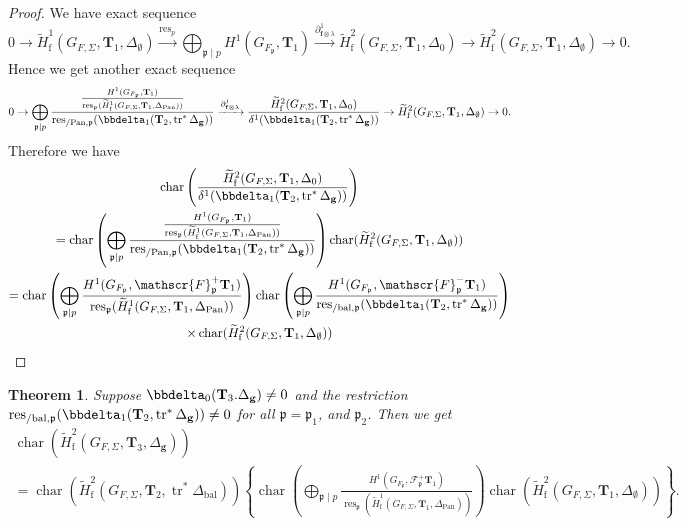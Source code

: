 \documentclass[10pt]{amsart}
\numberwithin{equation}{section}
\newtheorem{thm}{Theorem}[section]
\theoremstyle{definition}
\theoremstyle{remark} %
\DeclareMathOperator{\Char}{char}
\newcommand{\pan}{\mathrm{Pan}}
\DeclareMathOperator{\res}{res}
\DeclareMathOperator{\tr}{{tr}^*}
\renewcommand{\b}{\mathrm{bal}}
\newcommand{\f}{\mathbf{f}}
\newcommand{\scrF}{\mathscr{F}}
\newcommand{\g}{\mathbf{g}}
\newcommand{\p}{\mathfrak{p}}
\newcommand{\T}{\mathbf{T}}
\begin{document}
		\begin{proof}
			We have exact sequence
			\begin{equation}
				0 \rightarrow \widetilde{H}^1_{\mathrm{f}}(G_{F,\Sigma}, \T_1, \Delta_{\emptyset}) \xrightarrow{\res_p} \bigoplus_{\p \mid p} H^1(G_{F_\p},\T_{1}) \xrightarrow{\partial_{\f \otimes \lambda}^1} \widetilde{H}^2_{\mathrm{f}}(G_{F,\Sigma}, \T_1, \Delta_{0}) \rightarrow \widetilde{H}^2_{\mathrm{f}}(G_{F,\Sigma}, \T_1, \Delta_{\emptyset}) \rightarrow 0.
			\end{equation}
			Hence we get another exact sequence
			\begin{equation}
				0 \rightarrow \bigoplus_{\p \mid p} \dfrac{\frac{H^1(G_{F_\p},\T_{1})}{\res_{\p}(\widetilde{H}^1_{\mathrm{f}}(G_{F,\Sigma},\T_{1}, \Delta_{\pan})) }}{\res_{/\pan, \p}(\bbdelta_1(\T_2, \operatorname{tr}^*\Delta_{\g}))} \xrightarrow{\partial_{\f \otimes \lambda}^1} \dfrac{\widetilde{H}^2_{\mathrm{f}}(G_{F,\Sigma}, \T_1, \Delta_{0})}{\delta^1(\bbdelta_1(\T_{2}, \tr\Delta_{\g}))}\rightarrow \widetilde{H}^2_{\mathrm{f}}(G_{F,\Sigma}, \T_1, \Delta_{\emptyset}) \rightarrow 0.
			\end{equation}
			Therefore we have 
			\begin{multline}
				\Char\left( \dfrac{\widetilde{H}^2_{\mathrm{f}}(G_{F,\Sigma}, \T_1, \Delta_{0})}{\delta^1(\bbdelta_1(\T_{2}, \tr\Delta_{\g}))} \right) \\
				= \Char \left( \bigoplus_{\p \mid p} \dfrac{\frac{H^1(G_{F_\p},\T_{1})}{\res_{\p}(\widetilde{H}^1_{\mathrm{f}}(G_{F,\Sigma},\T_{1}, \Delta_{\pan})) }}{\res_{/\pan, \p}(\bbdelta_1(\T_2, \operatorname{tr}^*\Delta_{\g}))} \right) \Char(\widetilde{H}^2_{\mathrm{f}}(G_{F,\Sigma}, \T_1, \Delta_{\emptyset})) \\
				= \Char\left( \bigoplus_{\p \mid p}\frac{H^1(G_{F_\p},\scrF^+_\p \T_{1})}{\res_{\p}(\widetilde{H}^1_{\mathrm{f}}(G_{F,\Sigma},\T_{1}, \Delta_{\pan})) }\right) \Char\left( \bigoplus_{\p \mid p} \frac{H^1(G_{F_\p},\scrF^-_\p \T_{1})}{ \res_{/\b, \p}(\bbdelta_1(\T_2, \operatorname{tr}^*\Delta_{\g}))} \right) \\
				\times \Char(\widetilde{H}^2_{\mathrm{f}}(G_{F,\Sigma}, \T_1, \Delta_{\emptyset}))
			\end{multline}	
		\end{proof}

		\begin{thm}
			\label{main_theorem_2}
			Suppose $  \bbdelta_0(\T_{3}.\Delta_\g) \ne 0 $ and the restriction $ \res_{/\b, \p}(\bbdelta_1(\T_2, \operatorname{tr}^*\Delta_{\g})) \ne 0 $ for all $ \p = \p_1 $, and $ \p_2 $. Then we get
			\begin{multline*}
				\Char \left( \widetilde{H}^2_{\mathrm{f}}(G_{F,\Sigma}, \T_3, \Delta_{\g})  \right) \\
				= \Char(\widetilde{H}^2_{\mathrm{f}}(G_{F,\Sigma}, \T_2, \operatorname{tr}^*\Delta_{\mathrm{bal}}))
				\left\lbrace \Char\left( \bigoplus_{\p \mid p}\frac{H^1(G_{F_\p},\scrF^+_\p \T_{1})}{\res_{\p}(\widetilde{H}^1_{\mathrm{f}}(G_{F,\Sigma},\T_{1}, \Delta_{\pan})) }\right) \Char(\widetilde{H}^2_{\mathrm{f}}(G_{F,\Sigma}, \T_1, \Delta_{\emptyset})) \right\rbrace .
			\end{multline*}
		\end{thm}
\end{document}
